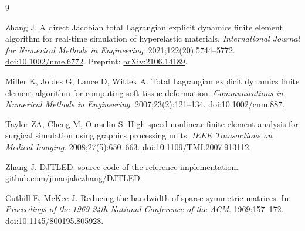 \documentclass[11pt,a4paper]{article}
\begin{document}
\begin{thebibliography}{9}

Zhang J. A direct Jacobian total Lagrangian explicit dynamics finite element algorithm for real-time simulation of hyperelastic materials. \emph{International Journal for Numerical Methods in Engineering}. 2021;122(20):5744--5772. \href{https://doi.org/10.1002/nme.6772}{doi:10.1002/nme.6772}. Preprint: \href{https://arxiv.org/abs/2106.14189}{arXiv:2106.14189}.

Miller K, Joldes G, Lance D, Wittek A. Total Lagrangian explicit dynamics finite element algorithm for computing soft tissue deformation. \emph{Communications in Numerical Methods in Engineering}. 2007;23(2):121--134. \href{https://doi.org/10.1002/cnm.887}{doi:10.1002/cnm.887}.

Taylor ZA, Cheng M, Ourselin S. High-speed nonlinear finite element analysis for surgical simulation using graphics processing units. \emph{IEEE Transactions on Medical Imaging}. 2008;27(5):650--663. \href{https://doi.org/10.1109/TMI.2007.913112}{doi:10.1109/TMI.2007.913112}.

Zhang J. DJTLED: source code of the reference implementation. \href{https://github.com/jinaojakezhang/DJTLED}{github.com/jinaojakezhang/DJTLED}.

Cuthill E, McKee J. Reducing the bandwidth of sparse symmetric matrices. In: \emph{Proceedings of the 1969 24th National Conference of the ACM}. 1969:157--172. \href{https://doi.org/10.1145/800195.805928}{doi:10.1145/800195.805928}.

\end{thebibliography}
\end{document}
